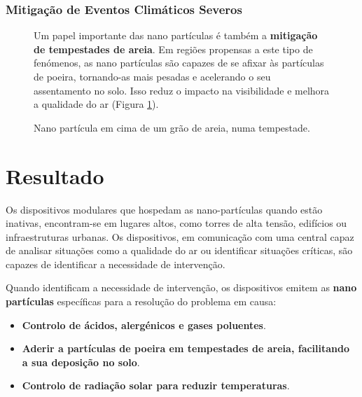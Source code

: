 \documentclass[a4paper, 11pt, onecolumn, oneside]{report}
\begin{document}

\subsection{Mitigação de Eventos Climáticos Severos}

\begin{figure}[h!]
    \centering
    \begin{minipage}{0.45\textwidth}
        \caption{Nano partícula em cima de um grão de areia, numa tempestade.}
        \label{fig:sandstorm}
    \end{minipage}
    \hfill
    \begin{minipage}{0.5\textwidth}
    \vspace{-1cm}
        Um papel importante das nano partículas é também a \textbf{mitigação de tempestades de areia}. Em regiões propensas a este tipo de fenómenos, as nano partículas são capazes de se afixar às partículas de poeira, tornando-as mais pesadas e acelerando o seu assentamento no solo. Isso reduz o impacto na visibilidade e melhora a qualidade do ar (Figura \ref{fig:sandstorm}).
    \end{minipage}
\end{figure}

\chapter{Resultado}
\label{chap.resultado}
Os dispositivos modulares que hospedam as nano-partículas quando estão inativas, encontram-se em lugares altos, como torres de alta tensão, edifícios ou infraestruturas urbanas. Os dispositivos, em comunicação com uma central capaz de analisar situações como a qualidade do ar ou identificar situações críticas, são capazes de identificar a necessidade de intervenção.
\par
Quando identificam a necessidade de intervenção, os dispositivos emitem as \textbf{nano partículas} específicas para a resolução do problema em causa: 
\begin{itemize}
    \item \textbf{Controlo de ácidos, alergénicos e gases poluentes}.
    \item \textbf{Aderir a partículas de poeira em tempestades de areia, facilitando a sua deposição no solo}.
    \item \textbf{Controlo de radiação solar para reduzir temperaturas}.
\end{itemize}
\end{document}
